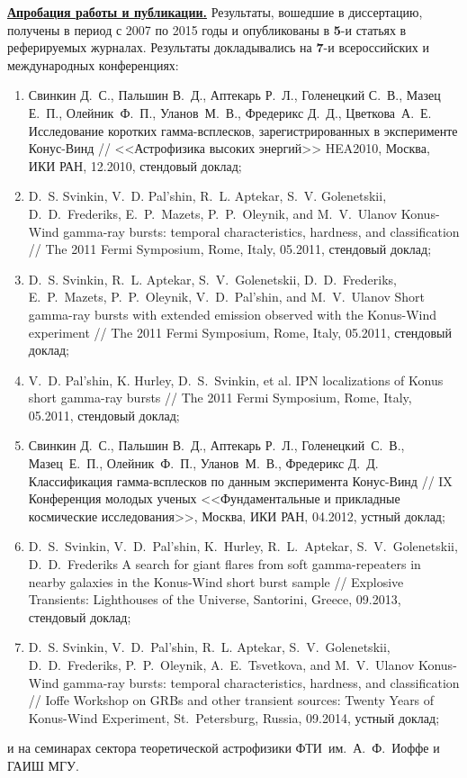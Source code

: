 \underline{\textbf{Апробация работы и публикации.}}
Результаты, вошедшие в диссертацию, получены в период с 2007 по 2015
годы и опубликованы в \textbf{5}-и статьях в реферируемых журналах.
Результаты докладывались на \textbf{7}-и всероссийских и международных конференциях: 
\begin{enumerate}
\item Свинкин Д.~С., Пальшин В.~Д., Аптекарь Р.~Л., Голенецкий С.~В., Мазец Е.~П., 
    Олейник~Ф.~П., Уланов~М.~В., Фредерикс Д.~Д., Цветкова~А.~Е.  
    Исследование коротких гамма-всплесков, зарегистрированных в эксперименте Конус-Винд //
    <<Астрофизика высоких энергий>> HEA2010, Москва, ИКИ РАН, 12.2010, стендовый доклад;
\item D.~S. Svinkin, V.~D. Pal'shin, R.~L. Aptekar, S.~V. Golenetskii, D.~D.~Frederiks, 
    E.~P.~Mazets, P.~P.~Oleynik, and M.~V.~Ulanov 
    Konus-Wind gamma-ray bursts: temporal characteristics, hardness, and classification //
    The 2011 Fermi Symposium, Rome, Italy, 05.2011, стендовый доклад;
\item D.~S. Svinkin, R.~L. Aptekar, S.~V.~Golenetskii, D.~D.~Frederiks, E.~P.~Mazets,
    P.~P.~Oleynik, V.~D.~Pal'shin, and M.~V.~Ulanov  
    Short gamma-ray bursts with extended emission observed with the Konus-Wind experiment //
    The 2011 Fermi Symposium, Rome, Italy, 05.2011, стендовый доклад;
\item V.~D. Pal'shin, K. Hurley, D.~S.~Svinkin, et al. 
    IPN localizations of Konus short gamma-ray bursts // 
    The 2011 Fermi Symposium, Rome, Italy, 05.2011, стендовый доклад;
\item Свинкин Д.~С., Пальшин В.~Д., Аптекарь Р.~Л., Голенецкий~С.~В., Мазец~Е.~П., 
    Олейник~Ф.~П., Уланов~М.~В., Фредерикс Д.~Д.  
    Классификация гамма-всплесков по данным эксперимента Конус-Винд //
    IX Конференция молодых ученых <<Фундаментальные и прикладные космические исследования>>, 
    Москва, ИКИ РАН, 04.2012, устный доклад;
\item D.~S.~Svinkin, V.~D.~Pal'shin, K.~Hurley, R.~L.~Aptekar, S.~V.~Golenetskii, D.~D.~Frederiks
    A search for giant flares from soft gamma-repeaters in nearby galaxies in the Konus-Wind short burst sample //
    Explosive Transients: Lighthouses of the Universe, Santorini, Greece, 09.2013, стендовый доклад;
\item D.~S. Svinkin, V.~D.~Pal'shin, R.~L. Aptekar, S.~V.~Golenetskii, D.~D.~Frederiks, 
    P.~P.~Oleynik, A.~E.~Tsvetkova, and M.~V.~Ulanov
    Konus-Wind gamma-ray bursts: temporal characteristics, hardness, and classification //
    Ioffe Workshop on GRBs and other transient sources: Twenty Years of Konus-Wind Experiment, 
    St.~Petersburg, Russia, 09.2014, устный доклад;
\end{enumerate}
и на семинарах сектора теоретической астрофизики ФТИ~им.~А.~Ф.~Иоффе и ГАИШ МГУ.


